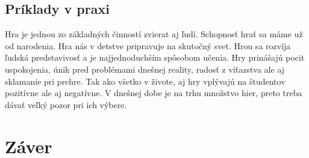 \documentclass[10pt,twoside,slovak,a4paper]{article}
\begin{document}
\subsection{Príklady v praxi} \label{Prax}

Hra je jednou zo základných činností zvierat aj ľudí. Schopnosť hrať sa máme už od narodenia. Hra nás v detstve pripravuje na skutočný svet. Hrou sa rozvíja ľudská predstavivosť a je najjednoduchším spôsobom učenia. Hry prinášajú pocit uspokojenia, únik pred problémami dnešnej reality, radosť z víťazstva ale aj sklamanie pri prehre.  Tak ako všetko v živote, aj hry vplývajú na študentov pozitívne ale aj negatívne. V dnešnej dobe je na trhu množstvo hier, preto treba dávať veľký pozor pri ich výbere.


\section{Záver}





\end{document}
